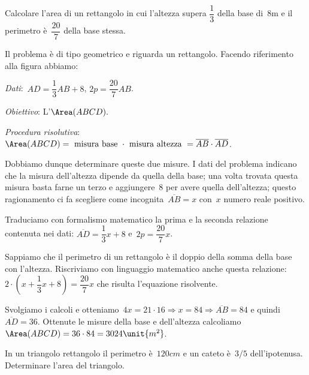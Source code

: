 \begin{problema}
 Calcolare l'area di un rettangolo in cui
l'altezza supera \(\dfrac{1}{3}\) della base di~8m e il
perimetro è~\(\dfrac{20}{7}\) della base stessa.
\end{problema}

\begin{soluzione}
 Il problema è di tipo geometrico e riguarda un rettangolo. Facendo riferimento 
alla figura abbiamo:
\begin{multicols}{2}
 \emph{Dati}:~\(AD=\dfrac{1}{3}AB+8\), \(2p=\dfrac{20}{7}AB\).

\emph{Obiettivo}: L'\(\Area (ABCD).\)

\begin{center}
 
\end{center}
\end{multicols}

\emph{Procedura risolutiva}:
\(\Area (ABCD)=\text{ misura base }\cdot \text{ misura altezza 
}=\overline{AB}\cdot \overline{AD}\).

Dobbiamo dunque determinare queste due misure. I dati del problema
indicano che la misura dell'altezza dipende da quella
della base; una volta trovata questa misura basta farne un terzo e
aggiungere~8 per avere quella dell'altezza; questo
ragionamento ci fa scegliere come incognita~\(\overline{AB}=x\)
con~\(x\) numero reale positivo.

Traduciamo con formalismo matematico la prima e la seconda relazione
contenuta nei dati:
\(\overline{AD}=\dfrac{1}{3}x+8\) e~\(2p=\dfrac{20}{7}x\).

Sappiamo che il perimetro di un rettangolo è il doppio della somma
della base con l'altezza. Riscriviamo con linguaggio
matematico anche questa relazione:~\(2\cdot 
\left(x+\dfrac{1}{3}x+8\right)=\dfrac{20}{7}x\)
che risulta l'equazione risolvente.

Svolgiamo i calcoli e otteniamo~\(4x=21\cdot 16\Rightarrow 
x=84\Rightarrow\overline{AB}=84\) e quindi~\(\overline{AD}=36\).
Ottenute le misure della base e dell'altezza calcoliamo~\(\Area (ABCD)=36\cdot 
84=3024\unit{{m}^{2}}\).
\end{soluzione}

\begin{problema}
In un triangolo rettangolo il perimetro è~\(120\unit{cm}\) e un cateto è~\(3/5\)
dell'ipotenusa. Determinare l'area del
triangolo.
\end{problema}


